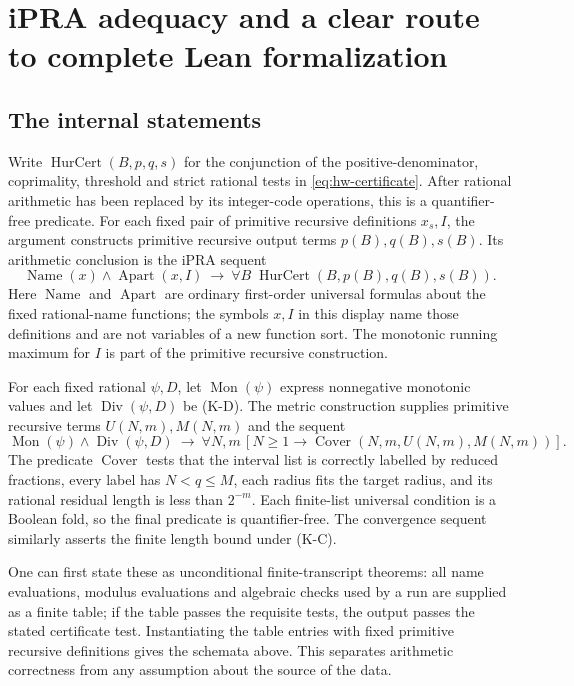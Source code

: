 \section{iPRA adequacy and a clear route to complete Lean formalization}
\label{sec:formalization}

\subsection{The internal statements}

Write $\operatorname{HurCert}(B,p,q,s)$ for the conjunction of the
positive-denominator, coprimality, threshold and strict rational tests in
\eqref{eq:hw-certificate}.  After rational arithmetic has been replaced
by its integer-code operations, this is a quantifier-free predicate.
For each fixed pair of primitive recursive definitions $x_s,I$, the
argument constructs primitive recursive output terms $p(B),q(B),s(B)$.
Its arithmetic conclusion is the iPRA sequent
\[
 \operatorname{Name}(x)\wedge\operatorname{Apart}(x,I)
 \ \longrightarrow\
 \forall B\;\operatorname{HurCert}(B,p(B),q(B),s(B)).
\]
Here $\operatorname{Name}$ and $\operatorname{Apart}$ are ordinary
first-order universal formulas about the fixed rational-name functions;
the symbols $x,I$ in this display name those definitions and are not
variables of a new function sort.  The monotonic running maximum for $I$
is part of the primitive recursive construction.

For each fixed rational $\psi,D$, let
$\operatorname{Mon}(\psi)$ express nonnegative monotonic values and let
$\operatorname{Div}(\psi,D)$ be (K-D).  The metric construction supplies
primitive recursive terms $U(N,m),M(N,m)$ and the sequent
\[
 \operatorname{Mon}(\psi)\wedge\operatorname{Div}(\psi,D)
 \ \longrightarrow\
 \forall N,m\,[N\ge1\to\operatorname{Cover}(N,m,U(N,m),M(N,m))].
\]
The predicate $\operatorname{Cover}$ tests that the interval list is
correctly labelled by reduced fractions, every label has $N<q\le M$,
each radius fits the target radius, and its rational residual length is
less than $2^{-m}$.  Each finite-list universal condition is a Boolean
fold, so the final predicate is quantifier-free.  The convergence
sequent similarly asserts the finite length bound under (K-C).

One can first state these as unconditional finite-transcript theorems:
all name evaluations, modulus evaluations and algebraic checks used by a
run are supplied as a finite table; if the table passes the requisite
tests, the output passes the stated certificate test.  Instantiating
the table entries with fixed primitive recursive definitions gives the
schemata above.  This separates arithmetic correctness from any
assumption about the source of the data.

